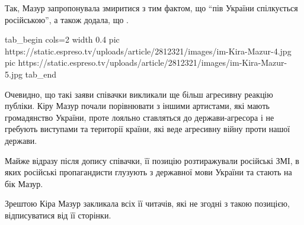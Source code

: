Так, Мазур запропонувала змиритися з тим фактом, що ``пів України спілкується
російською'', а також додала, що .

\ifcmt
tab_begin cols=2
  width 0.4
  pic https://static.espreso.tv/uploads/article/2812321/images/im-Kira-Mazur-4.jpg
  pic https://static.espreso.tv/uploads/article/2812321/images/im-Kira-Mazur-5.jpg
tab_end
\fi

Очевидно, що такі заяви співачки викликали ще більш агресивну реакцію публіки.
Кіру Мазур почали порівнювати з іншими артистами, які мають громадянство
України, проте лояльно ставляться до держави-агресора і не гребують виступами
та території країни, які веде агресивну війну проти нашої держави.

Майже відразу після допису співачки, її позицію розтиражували російські ЗМІ, в
яких російські пропагандисти глузують з державної мови України та стають на бік
Мазур.

Зрештою Кіра Мазур закликала всіх її читачів, які не згодні з такою позицією, відписуватися від її сторінки.
